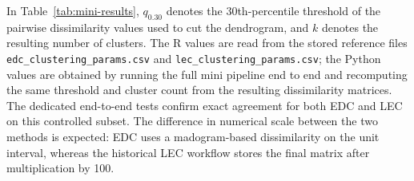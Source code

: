 \documentclass[preprint,12pt,a4paper]{elsarticle}
\begin{document}
{In Table~\ref{tab:mini-results}, $q_{0.30}$ denotes the
30th-percentile threshold of the pairwise dissimilarity values used
to cut the dendrogram, and $k$ denotes the resulting number of
clusters. The R values are read from the stored reference files
\texttt{edc\_clustering\_params.csv} and
\texttt{lec\_clustering\_params.csv}; the Python values are obtained
by running the full mini pipeline end to end and recomputing the same
threshold and cluster count from the resulting dissimilarity matrices.
The dedicated end-to-end tests confirm exact agreement for both EDC
and LEC on this controlled subset. The difference in numerical scale
between the two methods is expected: EDC uses a madogram-based
dissimilarity on the unit interval, whereas the historical LEC
workflow stores the final matrix after multiplication by 100.

}
\end{document}
